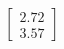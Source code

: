 \documentclass[preview]{standalone}
\begin{document}
\begin{align*}
\begin{bmatrix} 2.72 \\ 3.57 \end{bmatrix}
\end{align*}
\end{document}
